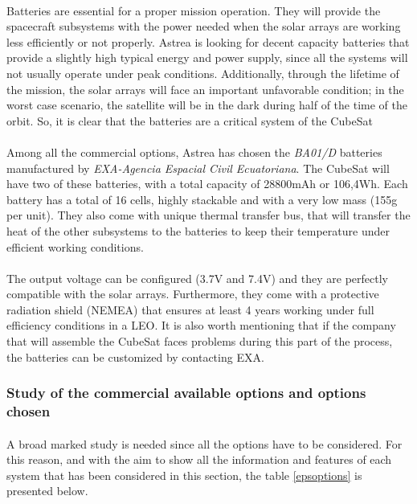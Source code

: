 \paragraph{}	Batteries are essential for a proper mission operation. They will provide the spacecraft subsystems with the power needed when the solar arrays are working less efficiently or not properly. Astrea is looking for decent capacity batteries that provide a slightly high typical energy and power supply, since all the systems will not usually operate under peak conditions. Additionally, through the lifetime of the mission, the solar arrays will face an important unfavorable condition; in the worst case scenario, the satellite will be in the dark during half of the time of the orbit. So, it is clear that the batteries are a critical system of the CubeSat

\paragraph{}Among all the commercial options, Astrea has chosen the \textit{BA01/D} batteries manufactured by \textit{EXA-Agencia Espacial Civil Ecuatoriana}. The CubeSat will have two of these batteries, with a total capacity of 28800mAh or 106,4Wh. Each battery has a total of 16 cells, highly stackable and with a very low mass (155g per unit). They also come with unique thermal transfer bus, that will transfer the heat of the other subsystems to the batteries to keep their temperature under efficient working conditions.

\paragraph{}The output voltage can be configured (3.7V and 7.4V) and they are perfectly compatible with the solar arrays. Furthermore, they come with a protective radiation shield (NEMEA) that ensures at least 4 years working under full efficiency conditions in a LEO. It is also worth mentioning that if the company that will assemble the CubeSat faces problems during this part of the process, the batteries can be customized by contacting EXA.

\subsubsection{Study of the commercial available options and options chosen}
\paragraph{}A broad marked study is needed since all the options have to be considered. For this reason, and with the aim to show all the information and features of each system that has been considered in this section, the table \ref{epsoptions} is presented below.


